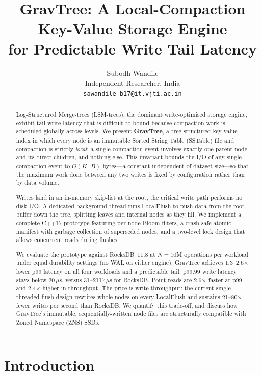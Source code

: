 \documentclass[10pt,twocolumn]{article}
\title{\textbf{GravTree: A Local-Compaction Key-Value Storage Engine\\
       for Predictable Write Tail Latency}}
\author{
  Subodh Wandile \\
  Independent Researcher, India \\
  \texttt{sawandile\_b17@it.vjti.ac.in}
}
\date{}
\begin{document}
\maketitle

\begin{abstract}
Log-Structured Merge-trees (LSM-trees), the dominant write-optimised storage
engine, exhibit tail write latency that is difficult to bound because
compaction work is scheduled globally across levels.  We present
\textbf{GravTree}, a tree-structured key-value index in which every node is an
immutable Sorted String Table (SSTable) file and compaction is strictly
\emph{local}: a single compaction event involves exactly one parent node and
its direct children, and nothing else.  This invariant bounds the I/O of any
single compaction event to $O(K \cdot B)$ bytes---a constant independent of
dataset size---so that the maximum work done between any two writes is fixed
by configuration rather than by data volume.

Writes land in an in-memory skip-list at the root; the critical write path
performs no disk I/O.  A dedicated background thread runs LocalFlush to push
data from the root buffer down the tree, splitting leaves and internal nodes
as they fill.  We implement a complete C++17 prototype featuring per-node Bloom
filters, a crash-safe atomic manifest with garbage collection of superseded
nodes, and a two-level lock design that allows concurrent reads during
flushes.

We evaluate the prototype against RocksDB~11.8 at $N = 10$M operations per
workload under equal durability settings (no WAL on either engine).  GravTree
achieves 1.3--2.6$\times$ lower p99 latency on all four workloads and a
predictable tail: p99.99 write latency stays below 20\,$\mu$s, versus
31--2117\,$\mu$s for RocksDB.  Point reads are 2.6$\times$ faster at p99 and
2.4$\times$ higher in throughput.  The price is write throughput: the current
single-threaded flush design rewrites whole nodes on every LocalFlush and
sustains 21--80$\times$ fewer writes per second than RocksDB.  We quantify
this trade-off, and discuss how GravTree's immutable, sequentially-written
node files are structurally compatible with Zoned Namespace (ZNS) SSDs.
\end{abstract}

\section{Introduction}
\label{sec:intro}
\end{document}
